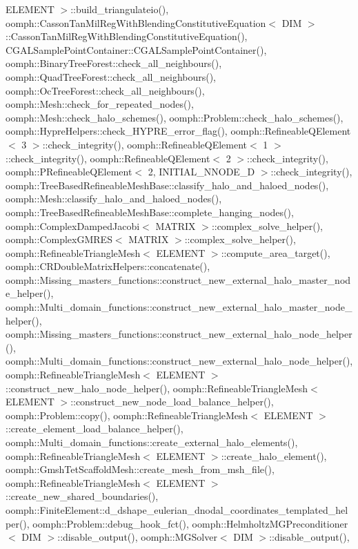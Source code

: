 E\+L\+E\+M\+E\+N\+T $>$\+::build\+\_\+triangulateio(), oomph\+::\+Casson\+Tan\+Mil\+Reg\+With\+Blending\+Constitutive\+Equation$<$ D\+I\+M $>$\+::\+Casson\+Tan\+Mil\+Reg\+With\+Blending\+Constitutive\+Equation(), C\+G\+A\+L\+Sample\+Point\+Container\+::\+C\+G\+A\+L\+Sample\+Point\+Container(), oomph\+::\+Binary\+Tree\+Forest\+::check\+\_\+all\+\_\+neighbours(), oomph\+::\+Quad\+Tree\+Forest\+::check\+\_\+all\+\_\+neighbours(), oomph\+::\+Oc\+Tree\+Forest\+::check\+\_\+all\+\_\+neighbours(), oomph\+::\+Mesh\+::check\+\_\+for\+\_\+repeated\+\_\+nodes(), oomph\+::\+Mesh\+::check\+\_\+halo\+\_\+schemes(), oomph\+::\+Problem\+::check\+\_\+halo\+\_\+schemes(), oomph\+::\+Hypre\+Helpers\+::check\+\_\+\+H\+Y\+P\+R\+E\+\_\+error\+\_\+flag(), oomph\+::\+Refineable\+Q\+Element$<$ 3 $>$\+::check\+\_\+integrity(), oomph\+::\+Refineable\+Q\+Element$<$ 1 $>$\+::check\+\_\+integrity(), oomph\+::\+Refineable\+Q\+Element$<$ 2 $>$\+::check\+\_\+integrity(), oomph\+::\+P\+Refineable\+Q\+Element$<$ 2, I\+N\+I\+T\+I\+A\+L\+\_\+\+N\+N\+O\+D\+E\+\_\+D $>$\+::check\+\_\+integrity(), oomph\+::\+Tree\+Based\+Refineable\+Mesh\+Base\+::classify\+\_\+halo\+\_\+and\+\_\+haloed\+\_\+nodes(), oomph\+::\+Mesh\+::classify\+\_\+halo\+\_\+and\+\_\+haloed\+\_\+nodes(), oomph\+::\+Tree\+Based\+Refineable\+Mesh\+Base\+::complete\+\_\+hanging\+\_\+nodes(), oomph\+::\+Complex\+Damped\+Jacobi$<$ M\+A\+T\+R\+I\+X $>$\+::complex\+\_\+solve\+\_\+helper(), oomph\+::\+Complex\+G\+M\+R\+E\+S$<$ M\+A\+T\+R\+I\+X $>$\+::complex\+\_\+solve\+\_\+helper(), oomph\+::\+Refineable\+Triangle\+Mesh$<$ E\+L\+E\+M\+E\+N\+T $>$\+::compute\+\_\+area\+\_\+target(), oomph\+::\+C\+R\+Double\+Matrix\+Helpers\+::concatenate(), oomph\+::\+Missing\+\_\+masters\+\_\+functions\+::construct\+\_\+new\+\_\+external\+\_\+halo\+\_\+master\+\_\+node\+\_\+helper(), oomph\+::\+Multi\+\_\+domain\+\_\+functions\+::construct\+\_\+new\+\_\+external\+\_\+halo\+\_\+master\+\_\+node\+\_\+helper(), oomph\+::\+Missing\+\_\+masters\+\_\+functions\+::construct\+\_\+new\+\_\+external\+\_\+halo\+\_\+node\+\_\+helper(), oomph\+::\+Multi\+\_\+domain\+\_\+functions\+::construct\+\_\+new\+\_\+external\+\_\+halo\+\_\+node\+\_\+helper(), oomph\+::\+Refineable\+Triangle\+Mesh$<$ E\+L\+E\+M\+E\+N\+T $>$\+::construct\+\_\+new\+\_\+halo\+\_\+node\+\_\+helper(), oomph\+::\+Refineable\+Triangle\+Mesh$<$ E\+L\+E\+M\+E\+N\+T $>$\+::construct\+\_\+new\+\_\+node\+\_\+load\+\_\+balance\+\_\+helper(), oomph\+::\+Problem\+::copy(), oomph\+::\+Refineable\+Triangle\+Mesh$<$ E\+L\+E\+M\+E\+N\+T $>$\+::create\+\_\+element\+\_\+load\+\_\+balance\+\_\+helper(), oomph\+::\+Multi\+\_\+domain\+\_\+functions\+::create\+\_\+external\+\_\+halo\+\_\+elements(), oomph\+::\+Refineable\+Triangle\+Mesh$<$ E\+L\+E\+M\+E\+N\+T $>$\+::create\+\_\+halo\+\_\+element(), oomph\+::\+Gmsh\+Tet\+Scaffold\+Mesh\+::create\+\_\+mesh\+\_\+from\+\_\+msh\+\_\+file(), oomph\+::\+Refineable\+Triangle\+Mesh$<$ E\+L\+E\+M\+E\+N\+T $>$\+::create\+\_\+new\+\_\+shared\+\_\+boundaries(), oomph\+::\+Finite\+Element\+::d\+\_\+dshape\+\_\+eulerian\+\_\+dnodal\+\_\+coordinates\+\_\+templated\+\_\+helper(), oomph\+::\+Problem\+::debug\+\_\+hook\+\_\+fct(), oomph\+::\+Helmholtz\+M\+G\+Preconditioner$<$ D\+I\+M $>$\+::disable\+\_\+output(), oomph\+::\+M\+G\+Solver$<$ D\+I\+M $>$\+::disable\+\_\+output(), 